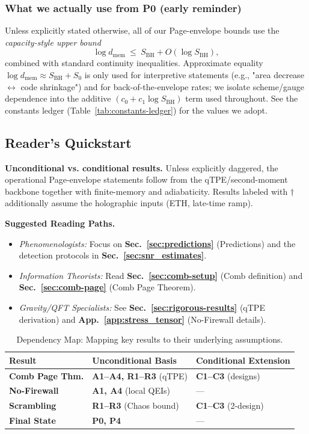 \documentclass[11pt,a4paper]{article}
\theoremstyle{plain}
\theoremstyle{definition}
\theoremstyle{remark}
\begin{document}
\subsubsection{What we actually use from P0 (early reminder)}
Unless explicitly stated otherwise, all of our Page-envelope bounds use the
 \emph{capacity-style upper bound}
\[
 \log d_{\mathrm{mem}} \ \le\  S_{\mathrm{BH}} + O(\log S_{\mathrm{BH}})\!,
\]
combined with standard continuity inequalities.
Approximate equality $\log d_{\mathrm{mem}}\approx S_{\mathrm{BH}}+S_0$ is only used
for interpretive statements (e.g., "area decrease $\leftrightarrow$ code shrinkage")
and for back-of-the-envelope rates; we isolate scheme/gauge dependence into the
additive $(c_0+c_1\log S_{\mathrm{BH}})$ term used throughout.  See the
constants ledger (Table~\ref{tab:constants-ledger}) for the values we adopt.

\subsection{Reader's Quickstart}
\label{sec:quickstart}
\noindent\textbf{Unconditional vs. conditional results.}
Unless explicitly daggered, the operational Page-envelope statements follow from the qTPE/second-moment backbone together with finite-memory and adiabaticity. Results labeled with \(\dagger\) additionally assume the holographic inputs (ETH, late-time ramp).

\noindent\textbf{Suggested Reading Paths.}
\begin{itemize}
    \item \emph{Phenomenologists:} Focus on \textbf{Sec.~\ref{sec:predictions}} (Predictions) and the detection protocols in \textbf{Sec.~\ref{sec:snr_estimates}}.
    \item \emph{Information Theorists:} Read \textbf{Sec.~\ref{sec:comb-setup}} (Comb definition) and \textbf{Sec.~\ref{sec:comb-page}} (Comb Page Theorem).
    \item \emph{Gravity/QFT Specialists:} See \textbf{Sec.~\ref{sec:rigorous-results}} (qTPE derivation) and \textbf{App.~\ref{app:stress_tensor}} (No-Firewall details).
\end{itemize}

\begin{table}[hbtp]
\centering
\small
\begin{tabular*}{\textwidth}{@{\extracolsep{\fill}}lll@{}}
\toprule
\textbf{Result} & \textbf{Unconditional Basis} & \textbf{Conditional Extension} \\
\midrule
\textbf{Comb Page Thm.} & \textbf{A1--A4, R1--R3} (qTPE) & \textbf{C1--C3} (designs) \\
\addlinespace
\textbf{No-Firewall} & \textbf{A1, A4} (local QEIs) & --- \\
\addlinespace
\textbf{Scrambling} & \textbf{R1--R3} (Chaos bound) & \textbf{C1--C3} (2-design) \\
\addlinespace
\textbf{Final State} & \textbf{P0, P4} & --- \\
\bottomrule
\end{tabular*}
\caption{Dependency Map: Mapping key results to their underlying assumptions.}
\label{tab:dependency_map_summary}
\end{table}
\end{document}
